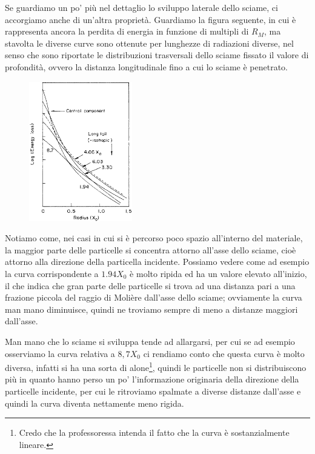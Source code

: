 Se guardiamo un po' più nel dettaglio lo sviluppo laterale dello sciame, ci accorgiamo anche di un'altra proprietà. Guardiamo la figura seguente, in cui è rappresenta ancora la perdita di energia in funzione di multipli di $R_M$, ma stavolta le diverse curve sono ottenute per lunghezze di radiazioni diverse, nel senso che sono riportate le distribuzioni trasversali dello sciame fissato il valore di profondità, ovvero la distanza longitudinale fino a cui lo sciame è penetrato.

\begin{figure}[H]
    \centering
    \includegraphics[width=0.4\textwidth]{immagini/raggio_di_Moliere_2.png}
\end{figure}

Notiamo come, nei casi in cui si è percorso poco spazio all'interno del materiale, la maggior parte delle particelle si concentra attorno all'asse dello sciame, cioè attorno alla direzione della particella incidente. Possiamo vedere come ad esempio la curva corrispondente a $1.94X_0$ è molto ripida ed ha un valore elevato all'inizio, il che indica che gran parte delle particelle si trova ad una distanza pari a una frazione piccola del raggio di Molière dall'asse dello sciame; ovviamente la curva man mano diminuisce, quindi ne troviamo sempre di meno a distanze maggiori dall'asse.

Man mano che lo sciame si sviluppa tende ad allargarsi, per cui se ad esempio osserviamo la curva relativa a $8,7X_0$ ci rendiamo conto che questa curva è molto diversa, infatti si ha una sorta di alone\footnote{Credo che la professoressa intenda il fatto che la curva è sostanzialmente lineare.}, quindi le particelle non si distribuiscono più in quanto hanno perso un po' l'informazione originaria della direzione della particelle incidente, per cui le ritroviamo spalmate a diverse distanze dall'asse e quindi la curva diventa nettamente meno rigida.

